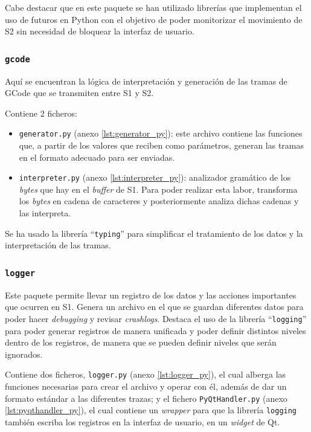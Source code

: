 Cabe destacar que en este paquete se han utilizado librerías  que implementan el uso de futuros en Python con el objetivo de poder monitorizar el movimiento de \ac{S2} sin necesidad de bloquear la interfaz de usuario.

\subsubsection{\texttt{gcode}}

Aquí se encuentran la lógica de interpretación y generación de las tramas de GCode que se transmiten entre \ac{S1} y \ac{S2}.

Contiene 2 ficheros:

\begin{itemize}
    \item \texttt{generator.py} (anexo \ref{lst:generator_py}): este archivo contiene las funciones que, a partir de los valores que reciben como parámetros, generan las tramas en el formato adecuado para ser enviadas.
    
    \item \texttt{interpreter.py} (anexo \ref{lst:interpreter_py}): analizador gramático de los \textit{bytes} que hay en el \textit{buffer} de \ac{S1}.
    Para poder realizar esta labor, transforma los \textit{bytes} en cadena de caracteres y posteriormente analiza dichas cadenas y las interpreta.
\end{itemize}

Se ha usado la librería ``\texttt{typing}'' para simplificar el tratamiento de los datos y la interpretación de las tramas.

\subsubsection{\texttt{logger}}

Este paquete permite llevar un registro de los datos y las acciones importantes que ocurren en \ac{S1}. Genera un archivo en el que se guardan diferentes datos para poder hacer \textit{debugging} y revisar \textit{crashlogs}.
Destaca el uso de la librería ``\texttt{logging}'' para poder generar registros de manera unificada y poder definir distintos niveles dentro de los registros, de manera que se pueden definir
niveles que serán ignorados.

Contiene dos ficheros, \texttt{logger.py} (anexo \ref{lst:logger_py}), el cual alberga las funciones necesarias para crear el archivo y operar con él, además de dar un formato estándar a las diferentes trazas;
y el fichero \texttt{PyQtHandler.py} (anexo \ref{lst:pyqthandler_py}), el cual
contiene un \textit{wrapper} para que la librería \texttt{logging} también escriba
los registros en la interfaz de usuario, en un \textit{widget} de Qt.

